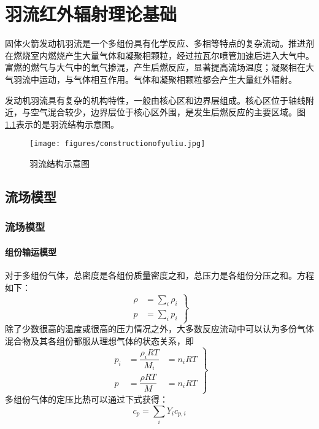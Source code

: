 \chapter{羽流红外辐射理论基础}
固体火箭发动机羽流是一个多组份具有化学反应、多相等特点的复杂流动。推进剂在燃烧室内燃烧产生大量气体和凝聚相颗粒，经过拉瓦尔喷管加速后进入大气中。富燃的燃气与大气中的氧气掺混，产生后燃反应，显著提高流场温度；凝聚相在大气羽流中运动，与气体相互作用。气体和凝聚相颗粒都会产生大量红外辐射。

发动机羽流具有复杂的机构特性，一般由核心区和边界层组成。核心区位于轴线附近，与空气混合较少，边界层位于核心区外围，是发生后燃反应的主要区域。图\ref{fig:constructionofyuliu}表示的是羽流结构示意图。
\begin{figure}[htbp]
	\centering
	\texttt{[image: figures/constructionofyuliu.jpg]}
	\caption{羽流结构示意图}
	\label{fig:constructionofyuliu}
\end{figure}
\section{流场模型}
\subsection{流场模型}
\subsubsection{组份输运模型}
对于多组份气体，总密度是各组份质量密度之和，总压力是各组份分压之和。方程如下：
\begin{equation}\left.
\begin{aligned}
\rho &=\sum _i\rho_i\\
  p &=\sum_i p_i 
\end{aligned}\right\}
\end{equation}
除了少数很高的温度或很高的压力情况之外，大多数反应流动中可以认为多份气体混合物及其各组份都服从理想气体的状态关系，即
\begin{equation}\left.
\begin{aligned}
p_i&=\dfrac{\rho_i RT}{M_i}&=n_iRT\\
p&=\dfrac{\rho RT}{M}&=n_iRT
\end{aligned}\right\}
\end{equation}
多组份气体的定压比热可以通过下式获得：
\begin{equation}
c_p=\sum_i Y_i c_{p,i}
\end{equation}
